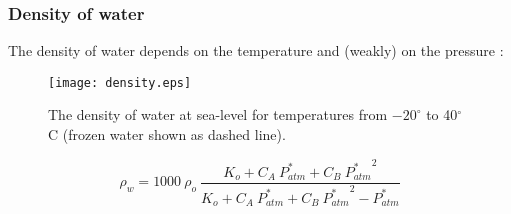 \subsubsection{Density of water}
\label{sec:density}
The density of water depends on the temperature and (weakly) on the pressure \parencite{chen77}:

\begin{figure}[ht!]
    \texttt{[image: density.eps]}
    \caption{The density of water at sea-level for temperatures from $-20^{\circ}$ to 40$^{\circ}$C (frozen water shown as dashed line).}
    \label{fig:density}
\end{figure}

\begin{equation}
\label{eq:density}
	\rho_w = 1000\: \rho_o \:\frac{
		K_o + C_A\: P_{atm}^{\ast} + C_B\: {P_{atm}^{\ast}}^2
	}{K_o + C_A\: P_{atm}^{\ast} + C_B\: {P_{atm}^{\ast}}^2 - P_{atm}^{\ast}}
\end{equation}


